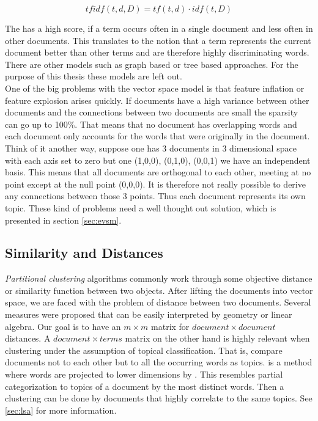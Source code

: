     \begin{equation}
      tfidf(t, d, D) = tf(t, d) \cdot idf(t, D)
    \end{equation}

    The \tfidf{} has a high score, if a term occurs often in a single document and less often in other documents. This translates to the notion that a term represents the current document better than other terms and are therefore highly discriminating words. There are other models such as graph based or tree based approaches. For the purpose of this thesis these models are left out. \cite[chp. 6]{IRBook2008}\\

    One of the big problems with the vector space model is that feature inflation or feature explosion arises quickly. If documents have a high variance between other documents and the connections between two documents are small the sparsity can go up to 100\%. That means that no document has overlapping words and each document only accounts for the words that were originally in the document. Think of it another way, suppose one has 3 documents in 3 dimensional space with each axis set to zero but one (1,0,0), (0,1,0), (0,0,1) we have an independent basis. This means that all documents are orthogonal to each other, meeting at no point except at the null point (0,0,0). It is therefore not really possible to derive any connections between those 3 points. Thus each document represents its own topic.
    These kind of problems need a well thought out solution, which is presented in section \ref{sec:evsm}.

  \subsection{Similarity and Distances}
  \label{sec:similarity}

    \emph{Partitional clustering} algorithms commonly work through some objective distance or similarity function between two objects. After lifting the documents into vector space, we are faced with the problem of distance between two documents. Several measures were proposed that can be easily interpreted by geometry or linear algebra. Our goal is to have an $m \times m$ matrix for $document \times document$ distances. A $document \times terms$ matrix on the other hand is highly relevant when clustering under the assumption of topical classification. That is, compare documents not to each other but to all the occurring words as topics. \lsafull{} is a method where words are projected to lower dimensions by \svdlong{}. This resembles partial categorization to topics of a document by the most distinct words. Then a clustering can be done by documents that highly correlate to the same topics. See \ref{sec:lsa} for more information.

